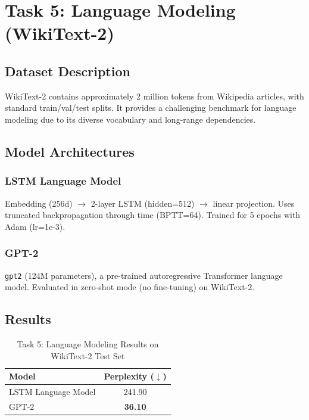 \documentclass[12pt, a4paper]{article}
\begin{document}
\section{Task 5: Language Modeling (WikiText-2)}

\subsection{Dataset Description}

WikiText-2 contains approximately 2 million tokens from Wikipedia articles, with standard train/val/test splits. It provides a challenging benchmark for language modeling due to its diverse vocabulary and long-range dependencies.

\subsection{Model Architectures}

\subsubsection{LSTM Language Model}
Embedding (256d) $\rightarrow$ 2-layer LSTM (hidden=512) $\rightarrow$ linear projection. Uses truncated backpropagation through time (BPTT=64). Trained for 5 epochs with Adam (lr=1e-3).

\subsubsection{GPT-2}
\texttt{gpt2} (124M parameters), a pre-trained autoregressive Transformer language model. Evaluated in zero-shot mode (no fine-tuning) on WikiText-2.

\subsection{Results}

\begin{table}[H]
\centering
\caption{Task 5: Language Modeling Results on WikiText-2 Test Set}
\label{tab:task5_results}
\begin{tabular}{lc}
\toprule
\textbf{Model} & \textbf{Perplexity ($\downarrow$)} \\
\midrule
LSTM Language Model & 241.90 \\
GPT-2 & \textbf{36.10} \\
\bottomrule
\end{tabular}
\end{table}
\end{document}

